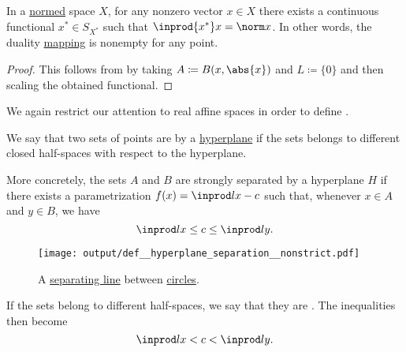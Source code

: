 \begin{corollary}\label{thm:hahn_banach_implies_duality_mapping_nonempty}
  In a \hyperref[def:norm]{normed} space \( X \), for any nonzero vector \( x \in X \) there exists a continuous functional \( x^* \in S_{X^*} \) such that \( \inprod {x^*} x = \norm x \). In other words, the duality \hyperref[def:duality_mapping]{mapping} is nonempty for any point.
\end{corollary}
\begin{proof}
  This follows from  by taking \( A \coloneqq B(x, \abs{x}) \) and \( L \coloneqq \{ 0 \} \) and then scaling the obtained functional.
\end{proof}

\begin{definition}\label{def:hyperplane_separation}
  We again restrict our attention to real affine spaces in order to define .

  \begin{thmenum}
     We say that two sets of points are  by a \hyperref[def:affine_hyperplane]{hyperplane} if the sets belongs to different closed half-spaces with respect to the hyperplane.

    More concretely, the sets \( A \) and \( B \) are strongly separated by a hyperplane \( H \) if there exists a parametrization \( f(x) = \inprod l x - c \) such that, whenever \( x \in A \) and \( y \in B \), we have
    \begin{equation}\label{eq:def:hyperplane_separation/nonstrict}
      \inprod l x \leq c \leq \inprod l y.
    \end{equation}

    \begin{figure}[!ht]
      \centering
      \texttt{[image: output/def\_\_hyperplane\_separation\_\_nonstrict.pdf]}
      \caption{A \hyperref[def:hyperplane_separation/nonstrict]{separating line} between \hyperref[def:circle]{circles}.}\label{fig:def:hyperplane_separation/nonstrict}
    \end{figure}

     If the sets belong to different  half-spaces, we say that they are . The inequalities then become
    \begin{equation}\label{eq:def:hyperplane_separation/strong}
      \inprod l x < c < \inprod l y.
    \end{equation}


\end{thmenum}
\end{definition}
